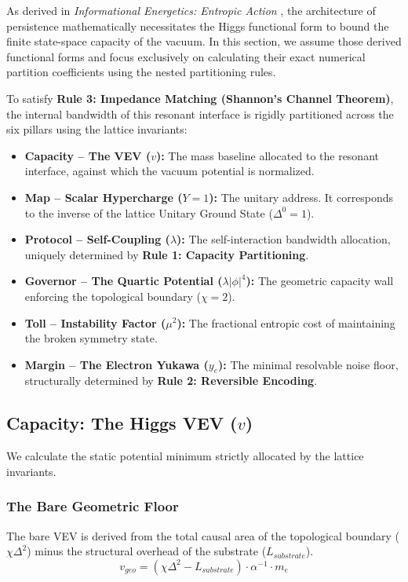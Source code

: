 As derived in \textit{Informational Energetics: Entropic Action} \cite{meyer_ieaction_2026}, the architecture of persistence mathematically necessitates the Higgs functional form to bound the finite state-space capacity of the vacuum. In this section, we assume those derived functional forms and focus exclusively on calculating their exact numerical partition coefficients using the nested partitioning rules. 

To satisfy \textbf{Rule 3: Impedance Matching (Shannon's Channel Theorem)}, the internal bandwidth of this resonant interface is rigidly partitioned across the six pillars using the lattice invariants:

\begin{itemize}
    \item \textbf{Capacity -- The VEV ($v$):} The mass baseline allocated to the resonant interface, against which the vacuum potential is normalized.
    \item \textbf{Map -- Scalar Hypercharge ($Y=1$):} The unitary address. It corresponds to the inverse of the lattice Unitary Ground State ($\Delta^0=1$).
    \item \textbf{Protocol -- Self-Coupling ($\lambda$):} The self-interaction bandwidth allocation, uniquely determined by \textbf{Rule 1: Capacity Partitioning}.
    \item \textbf{Governor -- The Quartic Potential ($\lambda|\phi|^4$):} The geometric capacity wall enforcing the topological boundary ($\chi=2$).
    \item \textbf{Toll -- Instability Factor ($\mu^2$):} The fractional entropic cost of maintaining the broken symmetry state.
    \item \textbf{Margin -- The Electron Yukawa ($y_e$):} The minimal resolvable noise floor, structurally determined by \textbf{Rule 2: Reversible Encoding}.
\end{itemize}

\subsection{Capacity: The Higgs VEV (\texorpdfstring{$v$}{v})}
We calculate the static potential minimum strictly allocated by the lattice invariants.

\subsubsection{The Bare Geometric Floor}
The bare VEV is derived from the total causal area of the topological boundary ($\chi \Delta^2$) minus the structural overhead of the substrate ($L_{substrate}$). 
\begin{equation}
v_{geo} = (\chi \Delta^2 - L_{substrate}) \cdot \alpha^{-1} \cdot m_e 
\end{equation}

